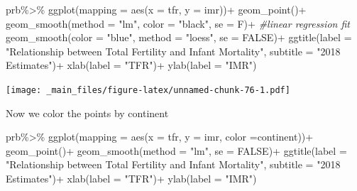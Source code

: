\documentclass[
]{book}
\newenvironment{Shaded}{\begin{snugshade}}{\end{snugshade}}
\newcommand{\AttributeTok}[1]{\textcolor[rgb]{0.77,0.63,0.00}{#1}}
\newcommand{\CommentTok}[1]{\textcolor[rgb]{0.56,0.35,0.01}{\textit{#1}}}
\newcommand{\ConstantTok}[1]{\textcolor[rgb]{0.00,0.00,0.00}{#1}}
\newcommand{\FunctionTok}[1]{\textcolor[rgb]{0.00,0.00,0.00}{#1}}
\newcommand{\NormalTok}[1]{#1}
\newcommand{\SpecialCharTok}[1]{\textcolor[rgb]{0.00,0.00,0.00}{#1}}
\newcommand{\StringTok}[1]{\textcolor[rgb]{0.31,0.60,0.02}{#1}}
\begin{document}
\begin{Shaded}
\begin{Highlighting}[]
\NormalTok{prb}\SpecialCharTok{\%\textgreater{}\%}
\FunctionTok{ggplot}\NormalTok{(}\AttributeTok{mapping =} \FunctionTok{aes}\NormalTok{(}\AttributeTok{x =}\NormalTok{ tfr,}
                    \AttributeTok{y =}\NormalTok{ imr))}\SpecialCharTok{+}
  \FunctionTok{geom\_point}\NormalTok{()}\SpecialCharTok{+}
  \FunctionTok{geom\_smooth}\NormalTok{(}\AttributeTok{method =} \StringTok{"lm"}\NormalTok{,}
              \AttributeTok{color =} \StringTok{"black"}\NormalTok{,}
              \AttributeTok{se =}\NormalTok{ F)}\SpecialCharTok{+} \CommentTok{\#linear regression fit}
  \FunctionTok{geom\_smooth}\NormalTok{(}\AttributeTok{color =} \StringTok{"blue"}\NormalTok{,}
              \AttributeTok{method =} \StringTok{"loess"}\NormalTok{,}
              \AttributeTok{se =} \ConstantTok{FALSE}\NormalTok{)}\SpecialCharTok{+}
  \FunctionTok{ggtitle}\NormalTok{(}\AttributeTok{label =} \StringTok{"Relationship between Total Fertility and Infant Mortality"}\NormalTok{,}
          \AttributeTok{subtitle =} \StringTok{"2018 Estimates"}\NormalTok{)}\SpecialCharTok{+}
  \FunctionTok{xlab}\NormalTok{(}\AttributeTok{label =} \StringTok{"TFR"}\NormalTok{)}\SpecialCharTok{+}
  \FunctionTok{ylab}\NormalTok{(}\AttributeTok{label =} \StringTok{"IMR"}\NormalTok{)}
\end{Highlighting}
\end{Shaded}

\texttt{[image: \_main\_files/figure-latex/unnamed-chunk-76-1.pdf]}

Now we color the points by continent

\begin{Shaded}
\begin{Highlighting}[]
\NormalTok{prb}\SpecialCharTok{\%\textgreater{}\%}
\FunctionTok{ggplot}\NormalTok{(}\AttributeTok{mapping =} \FunctionTok{aes}\NormalTok{(}\AttributeTok{x =}\NormalTok{ tfr, }
                     \AttributeTok{y =}\NormalTok{ imr,}
                     \AttributeTok{color =}\NormalTok{continent))}\SpecialCharTok{+}
  \FunctionTok{geom\_point}\NormalTok{()}\SpecialCharTok{+}
  \FunctionTok{geom\_smooth}\NormalTok{(}\AttributeTok{method =} \StringTok{"lm"}\NormalTok{,}
              \AttributeTok{se =} \ConstantTok{FALSE}\NormalTok{)}\SpecialCharTok{+}
  \FunctionTok{ggtitle}\NormalTok{(}\AttributeTok{label =} \StringTok{"Relationship between Total Fertility and Infant Mortality"}\NormalTok{,}
          \AttributeTok{subtitle =} \StringTok{"2018 Estimates"}\NormalTok{)}\SpecialCharTok{+}
  \FunctionTok{xlab}\NormalTok{(}\AttributeTok{label =} \StringTok{"TFR"}\NormalTok{)}\SpecialCharTok{+}
  \FunctionTok{ylab}\NormalTok{(}\AttributeTok{label =} \StringTok{"IMR"}\NormalTok{)}
\end{Highlighting}
\end{Shaded}
\end{document}
